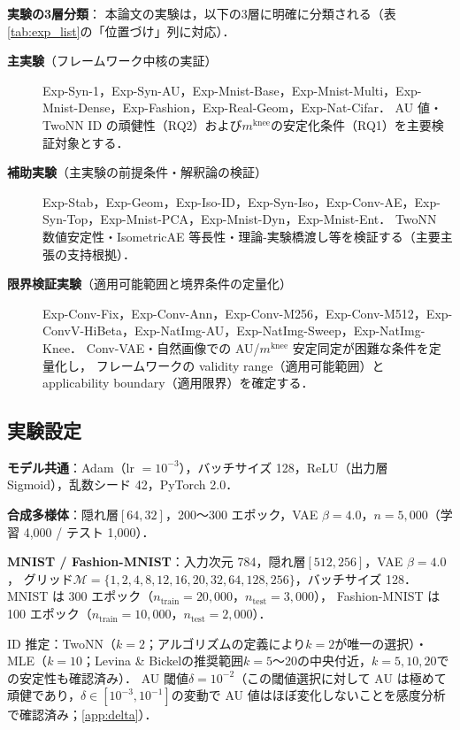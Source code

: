 \documentclass[11pt,a4paper]{jsarticle}
\newcommand{\mknee}{m^{\mathrm{knee}}}
\begin{document}
\textbf{実験の3層分類}：
本論文の実験は，以下の3層に明確に分類される（表\ref{tab:exp_list}の「位置づけ」列に対応）．
\begin{description}
  \item[\textbf{主実験}（フレームワーク中核の実証）]
        Exp-Syn-1，Exp-Syn-AU，Exp-Mnist-Base，Exp-Mnist-Multi，Exp-Mnist-Dense，Exp-Fashion，Exp-Real-Geom，Exp-Nat-Cifar．
        AU 値・TwoNN ID の頑健性（RQ2）および$\mknee$の安定化条件（RQ1）を主要検証対象とする．
  \item[\textbf{補助実験}（主実験の前提条件・解釈論の検証）]
        Exp-Stab，Exp-Geom，Exp-Iso-ID，Exp-Syn-Iso，Exp-Conv-AE，Exp-Syn-Top，Exp-Mnist-PCA，Exp-Mnist-Dyn，Exp-Mnist-Ent．
        TwoNN 数値安定性・IsometricAE 等長性・理論-実験橋渡し等を検証する（主要主張の支持根拠）．
  \item[\textbf{限界検証実験}（適用可能範囲と境界条件の定量化）]
        Exp-Conv-Fix，Exp-Conv-Ann，Exp-Conv-M256，Exp-Conv-M512，Exp-ConvV-HiBeta，Exp-NatImg-AU，Exp-NatImg-Sweep，Exp-NatImg-Knee．
        Conv-VAE・自然画像での AU/$\mknee$ 安定同定が困難な条件を定量化し，
        フレームワークの validity range（適用可能範囲）と applicability boundary（適用限界）を確定する．
\end{description}

\subsection{実験設定}\label{sec:exp_setup}

\textbf{モデル共通}：Adam（lr $= 10^{-3}$），バッチサイズ 128，ReLU（出力層 Sigmoid），乱数シード 42，PyTorch 2.0．

\textbf{合成多様体}：隠れ層$[64, 32]$，200〜300 エポック，VAE $\beta = 4.0$，$n = 5{,}000$（学習 4,000 / テスト 1,000）．

\textbf{MNIST / Fashion-MNIST}：入力次元 784，隠れ層$[512, 256]$，VAE $\beta = 4.0$，
グリッド$\mathcal{M} = \{1,2,4,8,12,16,20,32,64,128,256\}$，バッチサイズ 128．
MNIST は 300 エポック（$n_{\mathrm{train}} = 20{,}000$，$n_{\mathrm{test}} = 3{,}000$），
Fashion-MNIST は 100 エポック（$n_{\mathrm{train}} = 10{,}000$，$n_{\mathrm{test}} = 2{,}000$）．

ID 推定：TwoNN（$k=2$；アルゴリズムの定義により$k=2$が唯一の選択）・MLE（$k=10$；Levina \& Bickel\cite{levina2005mle}の推奨範囲$k=5$〜20の中央付近，$k=5,10,20$での安定性も確認済み）\cite{facco2017twonn,levina2005mle}．
AU 閾値$\delta = 10^{-2}$\cite{lucas2019elbo}（この閾値選択に対して AU は極めて頑健であり，$\delta \in [10^{-3}, 10^{-1}]$の変動で AU 値はほぼ変化しないことを感度分析で確認済み；\ref{app:delta}）．
\end{document}
